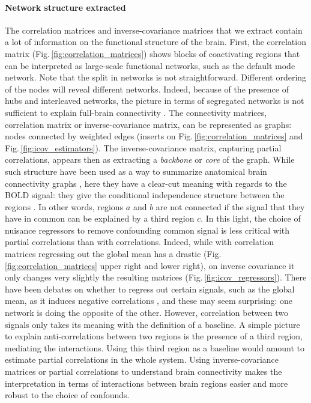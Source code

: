 \documentclass[5p]{elsarticle}
\begin{document}
\paragraph{Network structure extracted}
%
The correlation matrices and inverse-covariance matrices that we extract
contain a lot of information on the functional structure of the brain.
First, the correlation matrix (Fig.\,\ref{fig:correlation_matrices})
shows blocks of coactivating regions that can be interpreted as
large-scale functional networks, such as the default mode network. Note
that the split in networks is not straightforward. Different ordering of the
nodes will reveal different networks. Indeed, because of the presence of
hubs and interleaved networks, the picture in terms of segregated networks
is not sufficient to explain full-brain connectivity
\cite{varoquaux2012}. The connectivity matrices, correlation matrix or
inverse-covariance matrix, can be represented as graphs: nodes connected
by weighted edges (inserts on Fig.\,\ref{fig:correlation_matrices} and
Fig.\,\ref{fig:icov_estimators}). The inverse-covariance matrix,
capturing partial correlations, appears then as extracting a
\emph{backbone} or \emph{core} of the graph. While such structure have
been used as a way to summarize anatomical brain connectivity graphs
\cite{hagmann2008}, here they have a clear-cut meaning with regards to
the BOLD signal: they give the conditional independence structure between
the regions \cite{varoquaux2012}. In other words, regions $a$ and $b$ are
not connected if the signal that they have in common can be explained by
a third region $c$. In this light, the choice of nuisance regressors to
remove confounding common signal is less critical with partial
correlations than with correlations. Indeed, while with
correlation matrices regressing out the global mean has a drastic
(Fig.\,\ref{fig:correlation_matrices} upper right and lower right), on
inverse covariance it only changes very slightly the resulting matrices
(Fig.\,\ref{fig:icov_regressors}). There have been debates on whether to
regress out certain signals, such as the global mean,  as it induces
negative correlations \cite{murphy2009,chang2009,fox2009}, and these may seem
surprising: one network is doing the opposite of the other. However,
correlation between two signals only takes its meaning with the
definition of a baseline. A simple picture to explain anti-correlations
between two regions is the presence of a third region, mediating the
interactions. Using this third region as a baseline would amount to
estimate partial correlations in the whole system. Using 
inverse-covariance matrices or partial correlations to understand brain
connectivity makes the interpretation in terms of interactions between
brain regions easier and more robust to the choice of confounds.
\end{document}
